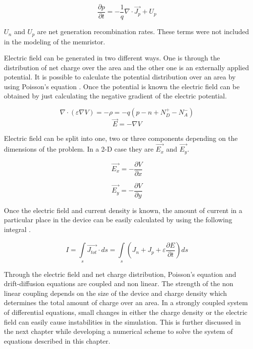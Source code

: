 \begin{doublespace}
\begin{equation}
\frac{\partial p}{\partial t}=-\frac{1}{q}\nabla \cdot \vec{J_p}+U_{p}
\label{conp}
\end{equation}

$U_{n}$ and $U_{p}$ are net generation recombination rates. These terms were not included in the modeling of the memristor. 

Electric field can be generated in two different ways. One is through the distribution of net charge over the area and the other one is an externally applied potential. It is possible to calculate the potential distribution over an area by using Poisson's equation \cite{Dragica1}. Once the potential is known the electric field can be obtained by just calculating the negative gradient of the electric potential.

\begin{equation}
\nabla \cdot  (\varepsilon \nabla V)=-\rho=-q(p-n+N_{D}^{+}-N_{A}^{-})
\label{poisson}
\end{equation}
\begin{equation}
\vec{E}=-\nabla V
\label{Efield}
\end{equation}

Electric field can be split into one, two or three components depending on the dimensions of the problem. In a 2-D case they are $\vec{E_x}$ and $\vec{E_y}$.

\begin{equation}
\vec{E_x}=-\frac{\partial V}{\partial x}
\end{equation}

\begin{equation}
\vec{E_y}=-\frac{\partial V}{\partial y}
\end{equation}

Once the electric field and current density is known, the amount of current in a particular place in the device can be easily calculated by using the following integral \cite{snowden}.

\begin{equation}
I=\int\limits_{s}^{}\vec{J_{tot}} \cdot ds = \int\limits_{s}^{}(J_n+J_p+\varepsilon\frac{\partial E}{\partial t})ds
\end{equation}


Through the electric field and net charge distribution, Poisson's equation and drift-diffusion equations are coupled and non linear. The strength of the non linear coupling depends on the size of the device and charge density which determines the total amount of charge over an area. In a strongly coupled system of differential equations, small changes in either the charge density or the electric field can easily cause instabilities in the simulation. This is further discussed in the next chapter while developing a numerical scheme to solve the system of equations described in this chapter. 


\end{doublespace}
